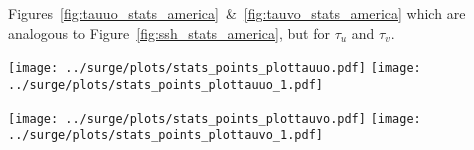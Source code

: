 Figures~\ref{fig:tauuo_stats_america}~&~\ref{fig:tauvo_stats_america} which
are analogous to Figure~\ref{fig:ssh_stats_america}, but for $\tau_u$ and
$\tau_v$.

\begin{figure*}[htb!]
    \centering
    \texttt{[image: ../surge/plots/stats\_points\_plottauuo.pdf]}
       \hspace{0pt} \texttt{[image: ../surge/plots/stats\_points\_plottauuo\_1.pdf]}
    \vspace{-7pt}
    \caption{\texttt{tauuo}, $\tau_u$ for \texttt{tyr}, \texttt{eUS}}
   \label{fig:tauuo_stats_america}

   \texttt{[image: ../surge/plots/stats\_points\_plottauvo.pdf]}
      \hspace{0pt} \texttt{[image: ../surge/plots/stats\_points\_plottauvo\_1.pdf]}
   \vspace{-7pt}
   \caption{\texttt{tauvo}, $\tau_v$ for \texttt{tyr}, \texttt{eUS}}
  \label{fig:tauvo_stats_america}
\end{figure*}
